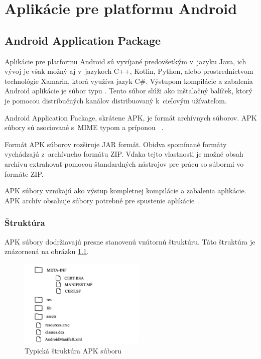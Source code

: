 \chapter{Aplikácie pre platformu Android}
\section{Android Application Package}
Aplikácie pre platformu Android sú vyvíjané predovšetkým v~jazyku Java, ich vývoj je však možný aj v~jazykoch C++, Kotlin, Python, alebo prostredníctvom technológie Xamarin, ktorá využíva jazyk C\#. Výstupom kompilácie a zabalenia Android aplikácie je súbor typu . Tento súbor slúži ako inštalačný balíček, ktorý je pomocou distribučných kanálov distribuovaný k~cieľovým užívateľom.

Android Application Package, skrátene APK, je formát archívnych súborov. APK súbory sú asociované s~MIME typom  a príponou ~\cite{IANA}. 

Formát APK súborov rozširuje JAR formát. Obidva spomínané formáty vychádzajú z~archívneho formátu ZIP. Vďaka tejto vlastnosti je možné obsah archívu extrahovať pomocou štandardných nástrojov pre prácu so súbormi vo formáte ZIP.

APK súbory vznikajú ako výstup kompletnej kompilácie a zabalenia aplikácie. APK archív obsahuje súbory potrebné pre spustenie aplikácie~\cite{Allen2015}.

\subsection{Štruktúra}
\label{sec:struktura}
APK súbory dodržiavajú presne stanovenú vnútornú štruktúru. Táto štruktúra je znázornená na obrázku \ref{fig:strukturaApk}.

\begin{figure}[htb]
  \begin{center}
    \includegraphics[width=60mm]{images/apkStructure.pdf}
  \end{center}
  \caption{Typická štruktúra APK súboru}
  \label{fig:strukturaApk}
\end{figure}


